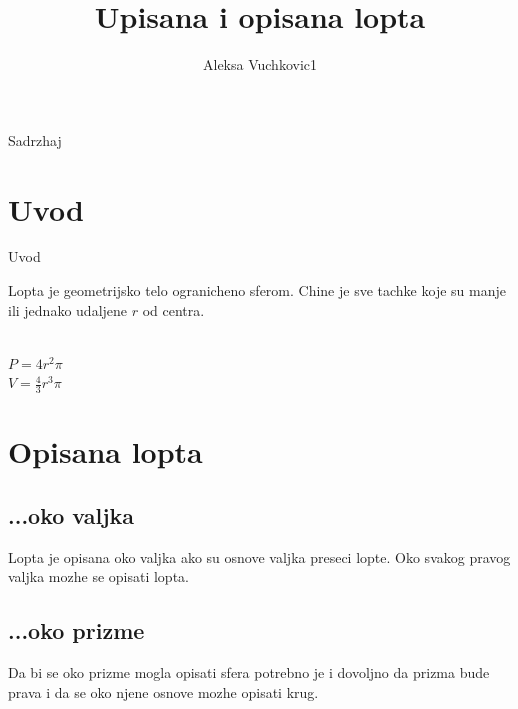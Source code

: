 \documentclass{beamer}
\title{\textbf{Upisana i opisana lopta}}
\author{Aleksa Vuchkovic1}
\date{}
\institute{Matematichka gimnazija, Beograd}
\begin{document}
\maketitle

\begin{frame}{Sadrzhaj}
\tableofcontents
\end{frame}

\section{Uvod}
\begin{frame}{Uvod}
\begin{block}{}
Lopta je geometrijsko telo ogranicheno sferom. Chine je sve tachke koje su manje ili jednako udaljene $r$ od centra.
\end{block}
\begin{multicols}{2}
\begin{figure}[H]
    
\end{figure}

\columnbreak
{}
\leavevmode\\[10pt]
\Large$P=4r^2\pi$\\
\Large$V=\frac{4}{3}r^3\pi$

\end{multicols}
\end{frame}

\section{Opisana lopta}
\subsection{...oko valjka}
\begin{frame}
\begin{block}{}
Lopta je opisana oko valjka ako su osnove valjka preseci lopte. Oko svakog
pravog valjka mozhe se opisati lopta.
\end{block}
\begin{figure}[H]
    
\end{figure}
\end{frame}
\subsection{...oko prizme}
\begin{frame}
\begin{block}{}
Da bi se oko prizme mogla opisati sfera potrebno je i dovoljno da prizma bude
prava i da se oko njene osnove mozhe opisati krug.
\end{block}
\begin{figure}[H]
    
\end{figure}
\end{frame}
\end{document}

